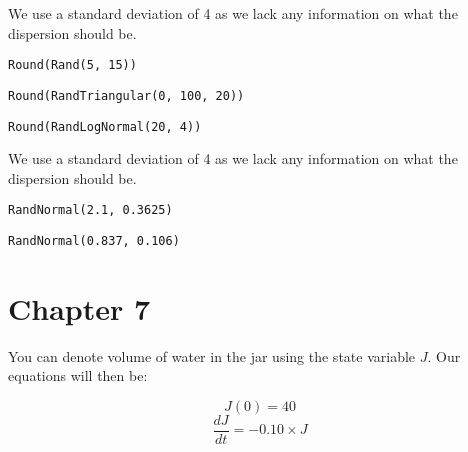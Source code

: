 \documentclass[]{memoir}
\begin{document}
We use a standard deviation of 4 as we lack any information on what the
dispersion should be.

\lstinline!Round(Rand(5, 15))!


\lstinline!Round(RandTriangular(0, 100, 20))!


\lstinline!Round(RandLogNormal(20, 4))!

We use a standard deviation of 4 as we lack any information on what the
dispersion should be.


\lstinline!RandNormal(2.1, 0.3625)!


\lstinline!RandNormal(0.837, 0.106)!

\section{Chapter 7}


You can denote volume of water in the jar using the state variable $J$.
Our equations will then be:

\[ J(0) = 40 \] \[ \frac{dJ}{dt} = -0.10 \times J\]

\end{document}
